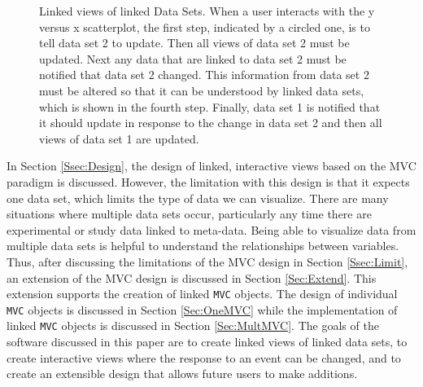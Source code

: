 \documentclass{article}[11pt]
\newcommand{\Robject}[1]{{\texttt{#1}}}
\begin{document}
\begin{figure}[ht]
  \begin{center}
    \caption{ Linked views of linked Data Sets.  When a user interacts with
      the y versus x scatterplot, the first step, indicated by a circled one,
      is to tell data set 2 to update.  Then all views of data set 2 must be
      updated.  Next any data that are linked to data set 2 must be notified
      that data set 2 changed.  This information from data set 2 must be
      altered so that it can be understood by linked data sets, which is shown
      in the fourth step.  Finally, data set 1 is notified that it should
      update in response to the change in data set 2 and then all views of
      data set 1 are updated. }
    \label{Fig:firstMP}
  \end{center}
\end{figure}

In Section \ref{Ssec:Design}, the design of linked, interactive views based on
the MVC paradigm is discussed.  However, the limitation with this design is
that it expects one data set, which limits the type of data we can visualize.
There are many situations where multiple data sets occur, particularly any
time there are experimental or study data linked to meta-data.  Being able to
visualize data from multiple data sets is helpful to understand the
relationships between variables.  Thus, after discussing the limitations of
the MVC design in Section \ref{Ssec:Limit}, an extension of the MVC design is
discussed in Section \ref{Sec:Extend}.  This extension supports the creation of
linked \Robject{MVC} objects.  The design of individual \Robject{MVC} objects
is discussed in 
Section \ref{Sec:OneMVC} while the implementation of linked \Robject{MVC}
objects is discussed in Section \ref{Sec:MultMVC}.  The goals of the software
discussed in this paper are to create linked views of linked data sets, to
create interactive views where the response to an event can be changed, and to
create an extensible design that allows future users to make additions.
\end{document}
